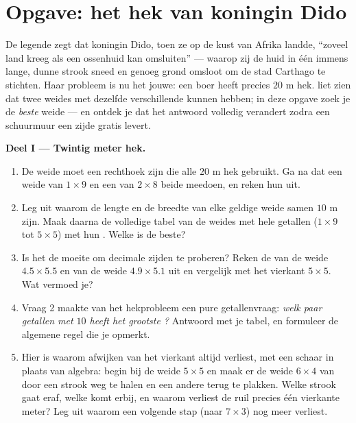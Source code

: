 \section{Opgave: het hek van koningin Dido}

\begin{problem}
\label{pb:g6:measure:1}
De legende zegt dat koningin Dido, toen ze op de kust van Afrika landde,
``zoveel land kreeg als een ossenhuid kan omsluiten'' --- waarop zij de huid in
één immens lange, dunne strook sneed en genoeg grond omsloot om de stad Carthago
te stichten. Haar probleem is nu het jouwe: een boer heeft precies $20$ m hek.
 liet zien dat twee weides met dezelfde 
verschillende  kunnen hebben; in deze opgave zoek je de \emph{beste}
weide --- en ontdek je dat het antwoord volledig verandert zodra een schuurmuur
een zijde gratis levert.

\medskip
\noindent\textbf{Deel I --- Twintig meter hek.}
\begin{enumerate}
  \item De weide moet een rechthoek zijn die alle $20$ m hek gebruikt. Ga na dat
        een weide van $1 \times 9$ en een van $2 \times 8$ beide meedoen, en
        reken hun  uit.
  \item Leg uit waarom de lengte en de breedte van elke geldige weide samen
        $10$ m zijn. Maak daarna de volledige tabel van de weides met hele
        getallen ($1 \times 9$ tot $5 \times 5$) met hun . Welke is
        de beste?
  \item Is het de moeite om decimale zijden te proberen? Reken de 
        van de weide $4.5 \times 5.5$ en van de weide $4.9 \times 5.1$ uit en
        vergelijk met het vierkant $5 \times 5$. Wat vermoed je?
  \item Vraag 2 maakte van het hekprobleem een pure getallenvraag: \emph{welk
        paar getallen met  $10$ heeft het grootste ?} Antwoord met je
        tabel, en formuleer de algemene regel die je opmerkt.
  \item Hier is waarom afwijken van het vierkant altijd verliest, met een schaar
        in plaats van algebra: begin bij de weide $5 \times 5$ en maak er de
        weide $6 \times 4$ van door een strook weg te halen en een andere terug
        te plakken. Welke strook gaat eraf, welke komt erbij, en waarom verliest
        de ruil precies één vierkante meter? Leg uit waarom een volgende stap
        (naar $7 \times 3$) nog meer verliest.
\end{enumerate}


\end{problem}
